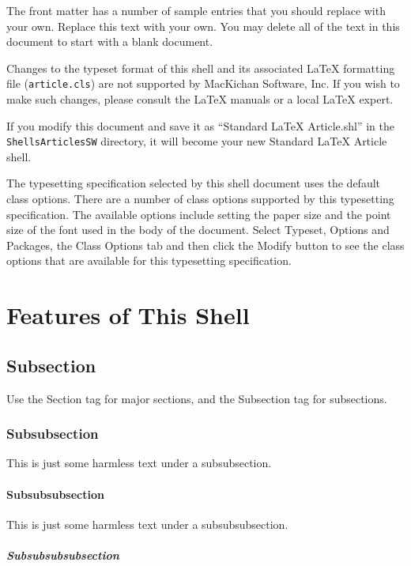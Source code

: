 \documentclass{article}
\begin{document}
The front matter has a number of sample entries that you should replace with
your own. Replace this text with your own. You may delete all of the text in
this document to start with a blank document.

Changes to the typeset format of this shell and its associated \LaTeX{}
formatting file (\texttt{article.cls}) are not supported by MacKichan
Software, Inc. If you wish to make such changes, please consult the \LaTeX{}
manuals or a local \LaTeX{} expert.

If you modify this document and save it as ``Standard LaTeX Article.shl'' in
the \texttt{Shells\TEXTsymbol{\backslash}Articles\TEXTsymbol{\backslash}SW}
directory, it will become your new Standard LaTeX Article shell.

The typesetting specification selected by this shell document uses the
default class options. There are a number of class options supported by this
typesetting specification. The available options include setting the paper
size and the point size of the font used in the body of the document. Select 
\textsf{Typeset, Options and Packages}, the \textsf{Class Options} tab and
then click the \textsf{Modify} button to see the class options that are
available for this typesetting specification.

\section{Features of This Shell}

\subsection{Subsection}

Use the Section tag for major sections, and the Subsection tag for
subsections.

\subsubsection{Subsubsection}

This is just some harmless text under a subsubsection.

\paragraph{Subsubsubsection}

This is just some harmless text under a subsubsubsection.

\subparagraph{Subsubsubsubsection}
\end{document}
